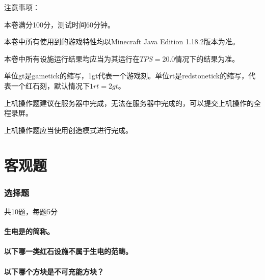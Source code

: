 \documentclass{exampaper}
\date{}
\begin{document}
    \maketitle

    \begin{material}
        \noindent \heiti 注意事项： \songti

        \begin{compactenum}
            \item 本卷满分100分，测试时间60分钟。
            \item 本卷中所有使用到的游戏特性均以Minecraft Java Edition 1.18.2版本为准。
            \item 本卷中所有设施运行结果均应当为其运行在$TPS=20.0$情况下的结果为准。
            \item 单位gt是gametick的缩写，1gt代表一个游戏刻。单位rt是redstonetick的缩写，代表一个红石刻，默认情况下$1rt=2gt$。
            \item 上机操作题建议在服务器中完成，无法在服务器中完成的，可以提交上机操作的全程录屏。
            \item 上机操作题应当使用创造模式进行完成。
        \end{compactenum}
    \end{material}

    \part{客观题}
        \section{选择题}{共10题，每题5分}
            \subsection{生电是\dash{1cm}的简称。}
            
            \subsection{以下哪一类红石设施不属于生电的范畴。}
            
            \subsection{以下哪个方块是不可充能方块？}
            
\end{document}
